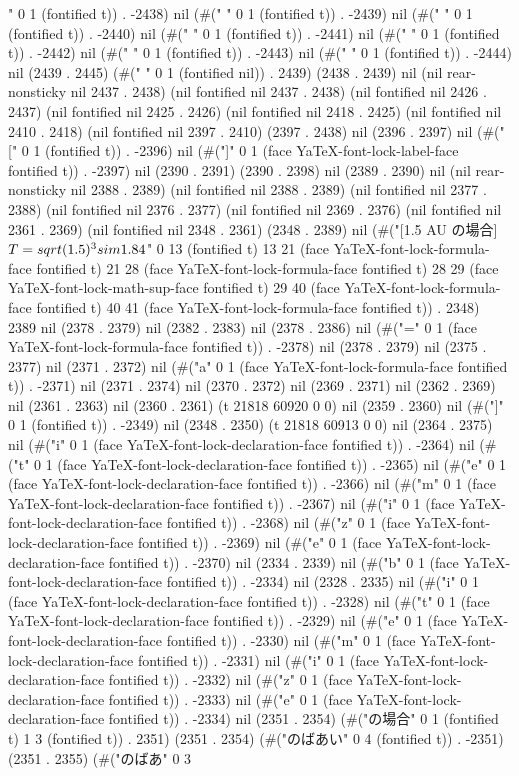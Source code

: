 " 0 1 (fontified t)) . -2438) nil (#("	" 0 1 (fontified t)) . -2439) nil (#(" " 0 1 (fontified t)) . -2440) nil (#(" " 0 1 (fontified t)) . -2441) nil (#(" " 0 1 (fontified t)) . -2442) nil (#(" " 0 1 (fontified t)) . -2443) nil (#(" " 0 1 (fontified t)) . -2444) nil (2439 . 2445) (#(" " 0 1 (fontified nil)) . 2439) (2438 . 2439) nil (nil rear-nonsticky nil 2437 . 2438) (nil fontified nil 2437 . 2438) (nil fontified nil 2426 . 2437) (nil fontified nil 2425 . 2426) (nil fontified nil 2418 . 2425) (nil fontified nil 2410 . 2418) (nil fontified nil 2397 . 2410) (2397 . 2438) nil (2396 . 2397) nil (#("[" 0 1 (fontified t)) . -2396) nil (#("]" 0 1 (face YaTeX-font-lock-label-face fontified t)) . -2397) nil (2390 . 2391) (2390 . 2398) nil (2389 . 2390) nil (nil rear-nonsticky nil 2388 . 2389) (nil fontified nil 2388 . 2389) (nil fontified nil 2377 . 2388) (nil fontified nil 2376 . 2377) (nil fontified nil 2369 . 2376) (nil fontified nil 2361 . 2369) (nil fontified nil 2348 . 2361) (2348 . 2389) nil (#("[1.5 AU の場合] $T=\\sqrt{(1.5)^3} \\sim 1.84$" 0 13 (fontified t) 13 21 (face YaTeX-font-lock-formula-face fontified t) 21 28 (face YaTeX-font-lock-formula-face fontified t) 28 29 (face YaTeX-font-lock-math-sup-face fontified t) 29 40 (face YaTeX-font-lock-formula-face fontified t) 40 41 (face YaTeX-font-lock-formula-face fontified t)) . 2348) 2389 nil (2378 . 2379) nil (2382 . 2383) nil (2378 . 2386) nil (#("=" 0 1 (face YaTeX-font-lock-formula-face fontified t)) . -2378) nil (2378 . 2379) nil (2375 . 2377) nil (2371 . 2372) nil (#("a" 0 1 (face YaTeX-font-lock-formula-face fontified t)) . -2371) nil (2371 . 2374) nil (2370 . 2372) nil (2369 . 2371) nil (2362 . 2369) nil (2361 . 2363) nil (2360 . 2361) (t 21818 60920 0 0) nil (2359 . 2360) nil (#("]" 0 1 (fontified t)) . -2349) nil (2348 . 2350) (t 21818 60913 0 0) nil (2364 . 2375) nil (#("i" 0 1 (face YaTeX-font-lock-declaration-face fontified t)) . -2364) nil (#("t" 0 1 (face YaTeX-font-lock-declaration-face fontified t)) . -2365) nil (#("e" 0 1 (face YaTeX-font-lock-declaration-face fontified t)) . -2366) nil (#("m" 0 1 (face YaTeX-font-lock-declaration-face fontified t)) . -2367) nil (#("i" 0 1 (face YaTeX-font-lock-declaration-face fontified t)) . -2368) nil (#("z" 0 1 (face YaTeX-font-lock-declaration-face fontified t)) . -2369) nil (#("e" 0 1 (face YaTeX-font-lock-declaration-face fontified t)) . -2370) nil (2334 . 2339) nil (#("b" 0 1 (face YaTeX-font-lock-declaration-face fontified t)) . -2334) nil (2328 . 2335) nil (#("i" 0 1 (face YaTeX-font-lock-declaration-face fontified t)) . -2328) nil (#("t" 0 1 (face YaTeX-font-lock-declaration-face fontified t)) . -2329) nil (#("e" 0 1 (face YaTeX-font-lock-declaration-face fontified t)) . -2330) nil (#("m" 0 1 (face YaTeX-font-lock-declaration-face fontified t)) . -2331) nil (#("i" 0 1 (face YaTeX-font-lock-declaration-face fontified t)) . -2332) nil (#("z" 0 1 (face YaTeX-font-lock-declaration-face fontified t)) . -2333) nil (#("e" 0 1 (face YaTeX-font-lock-declaration-face fontified t)) . -2334) nil (2351 . 2354) (#("の場合" 0 1 (fontified t) 1 3 (fontified t)) . 2351) (2351 . 2354) (#("のばあい" 0 4 (fontified t)) . -2351) (2351 . 2355) (#("のばあ" 0 3 